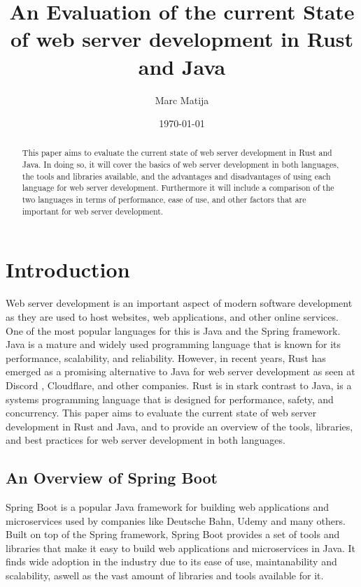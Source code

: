 \documentclass[a4paper,12pt]{article}
\title{An Evaluation of the current State of web server development in Rust and Java}
\author{Marc Matija}
\date{\today}
\begin{document}
	\maketitle
	\vspace{2cm}
	\begin{abstract}
		This paper aims to evaluate the current state of web server development in Rust and Java. 
		In doing so, it will cover the basics of web server development in both languages, the tools and libraries 
		available, and the advantages and disadvantages of using each language for web server development. 
		Furthermore it will include a comparison of the two languages in terms of performance, ease of 
		use, and other factors that are important for web server development.
	\end{abstract}
	
	\newpage
	\tableofcontents
	\newpage
	
	\section{Introduction}
	\label{sec:introduction}
	Web server development is an important aspect of modern software development as they are 
	used to host websites, web applications, and other online services.
	One of the most popular languages for this is Java and the Spring framework.
	Java is a mature and widely used programming language that is known for its performance, scalability, and reliability.
	However, in recent years, Rust has emerged as a promising alternative to Java for web server development as seen at Discord 
	\cite{Discord}, Cloudflare\cite{Cloudflare_Pingora}, and other companies. 
	Rust is in stark contrast to Java, is a systems programming language that is designed for performance, safety, and concurrency.
	This paper aims to evaluate the current state of web server development in Rust and Java, and to provide an overview of 
	the tools, libraries, and best practices for web server development in both languages.
	
	\subsection{An Overview of Spring Boot}
	\label{subsec:spring_boot}
	Spring Boot is a popular Java framework for building web applications and microservices used by companies like 
	Deutsche Bahn\cite{DB_Job_Description}, Udemy \cite{Techstack_Udemy} and many others\cite{Spring_Boot_stackshare}.
	Built on top of the Spring framework, Spring Boot provides a set of tools and libraries that make it easy to build
	web applications and microservices in Java. It finds wide adoption in the industry due to its ease of use, maintanability 
	and scalability, aswell as the vast amount of libraries and tools available for it.
\end{document}
